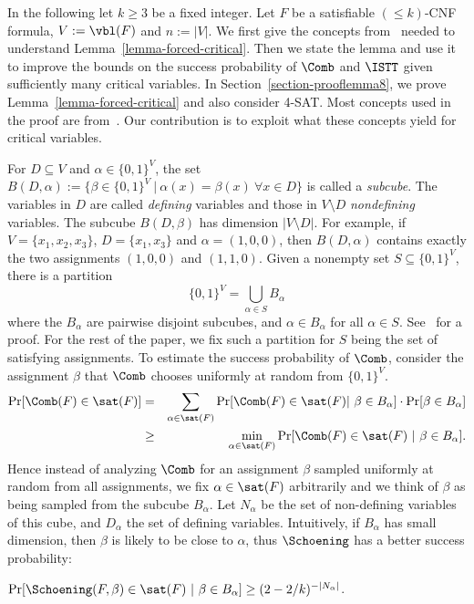 In the following let $k\geq 3$ be a fixed integer. Let $F$ be a
satisfiable $(\leq k)$-CNF formula, $V:=\vbl(F)$ and $n:=|V|$. 
We first give the concepts from~\cite{ppsz} needed to understand Lemma~\ref{lemma-forced-critical}. Then we state the lemma and
use it to improve
the bounds on the success probability of $\Comb$ and $\ISTT$ given sufficiently many critical variables. In Section~\ref{section-prooflemma8}, we prove Lemma~\ref{lemma-forced-critical} and also consider 4-SAT. Most concepts used in the proof are from~\cite{ppsz,rolf2006}. Our contribution is to exploit what these concepts yield for critical variables.\paragraphprev

 For $D\subseteq V$ and $\alpha\in\{0,1\}^V$, the
set $ B(D,\alpha) := \{\beta \in \{0,1\}^V \ | \ \alpha(x)=\beta(x)\
\forall x \in D \} $ is called a \emph{subcube}. The variables in $D$
are called \emph{defining} variables and those in $V\setminus D$
\emph{nondefining} variables. The subcube $B(D,\beta)$ has dimension
$|V\setminus D|$.  For example, if $V = \{x_1,x_2,x_3\}$, $D =
\{x_1,x_3\}$ and $\alpha = (1,0,0)$, then $B(D,\alpha)$ contains
exactly the two assignments $(1,0,0)$ and $(1,1,0)$. Given a nonempty
set $S \subseteq \{0,1\}^V$, there is a partition
$$
\{0,1\}^V = \bigcup_{\alpha \in S} B_{\alpha}
$$
where the $B_\alpha$ are pairwise disjoint subcubes, and $\alpha \in
B_\alpha$ for all $\alpha \in S$. See~\cite{ppsz} for a proof.  For
the rest of the paper, we fix such a partition for $S$ being the set
of satisfying assignments. To estimate the success probability of
$\Comb$, consider the assignment $\beta$ that $\Comb$ chooses
uniformly at random from $\{0,1\}^V$.
\begin{eqnarray*}
\Pr[\Comb(F) \in \sat(F)] & 
= & \sum_{\alpha \in \sat(F)}\Pr[\Comb(F) \in \sat(F) | \ \beta \in B_\alpha]
\cdot \Pr[\beta \in B_\alpha] \\
& \geq & 
\min_{\alpha \in \sat(F)}\Pr[\Comb(F) \in \sat(F) \ | \ \beta \in B_\alpha].
\end{eqnarray*}
Hence instead of analyzing $\Comb$ for an
assignment $\beta$ sampled uniformly at random from all assignments, we fix $\alpha\in\sat(F)$ arbitrarily and
we think of $\beta$ as being sampled from the subcube $B_\alpha$.  Let
$N_\alpha$ be the set of non-defining variables of this cube, and
$D_\alpha$ the set of defining variables.  Intuitively, if
$B_\alpha$ has small dimension, then $\beta$ is likely to be close to
$\alpha$, thus $\Schoening$ has a better success probability:
\begin{lemma}[\cite{it04}]
  $\Pr[\Schoening(F,\beta) \in \sat(F) \ | \ \beta \in B_\alpha]
  \geq (2-2/k)^{-|N_\alpha|}$.
  \label{lemma-schoening-IT}
\end{lemma}

